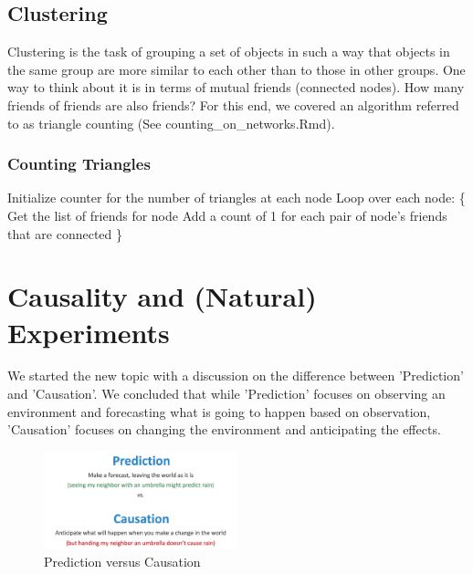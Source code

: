 \subsection{Clustering}
Clustering is the task of grouping a set of objects in such a way that objects in the same group are more similar to each other than to those in other groups. One way to think about it is in terms of mutual friends (connected nodes). How many friends of friends are also friends? For this end, we covered an algorithm referred to as triangle counting (See counting\_on\_networks.Rmd).

\subsubsection*{Counting Triangles}
Initialize counter for the number of triangles at each node \newline
Loop over each node: \{ \newline
Get the list of friends for node \newline
Add a count of 1 for each pair of node's friends that are connected \newline
\} \newline
\newpage
\section{Causality and (Natural) Experiments}
We started the new topic with a discussion on the difference between 'Prediction' and 'Causation'. We concluded that while 'Prediction' focuses on observing an environment and forecasting what is going to happen based on observation, 'Causation' focuses on changing the environment and anticipating the effects.

\begin{figure}[ht]
  \begin{center}
    \includegraphics[width=0.5\textwidth]{figures/pred-caus.png}
    \caption{Prediction versus Causation}
    \label{fig:pred-caus}
  \end{center}
\end{figure}

